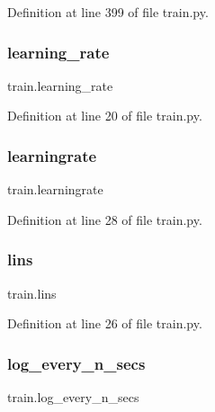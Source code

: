 Definition at line 399 of file train.\+py.

\mbox{\label{namespacetrain_a00dfae526f6aa07d0497b80a4ccd9e7c}} 
\subsubsection{\texorpdfstring{learning\+\_\+rate}{learning\_rate}}
{\footnotesize\ttfamily train.\+learning\+\_\+rate}



Definition at line 20 of file train.\+py.

\mbox{\label{namespacetrain_abb1ef436e0c9358251dab8f43b5eaf55}} 
\subsubsection{\texorpdfstring{learningrate}{learningrate}}
{\footnotesize\ttfamily train.\+learningrate}



Definition at line 28 of file train.\+py.

\mbox{\label{namespacetrain_ae4aaa73ae0ad421183d4ab36f0d8fc8e}} 
\subsubsection{\texorpdfstring{lins}{lins}}
{\footnotesize\ttfamily train.\+lins}



Definition at line 26 of file train.\+py.

\mbox{\label{namespacetrain_a57337d73f2578ad533e001720a3f899e}} 
\subsubsection{\texorpdfstring{log\+\_\+every\+\_\+n\+\_\+secs}{log\_every\_n\_secs}}
{\footnotesize\ttfamily train.\+log\+\_\+every\+\_\+n\+\_\+secs}



